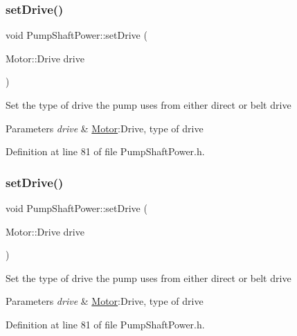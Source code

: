 \subsubsection{\texorpdfstring{set\+Drive()}{setDrive()}\hspace{0.1cm}{\footnotesize\ttfamily [1/3]}}
{\footnotesize\ttfamily void Pump\+Shaft\+Power\+::set\+Drive (\begin{DoxyParamCaption}\item[{Motor\+::\+Drive}]{drive }\end{DoxyParamCaption})\hspace{0.3cm}{\ttfamily [inline]}}

Set the type of drive the pump uses from either direct or belt drive 
\begin{DoxyParams}{Parameters}
{\em drive} & \hyperlink{struct_motor}{Motor}\+:Drive, type of drive \\
\hline
\end{DoxyParams}


Definition at line 81 of file Pump\+Shaft\+Power.\+h.

\mbox{\label{class_pump_shaft_power_a5cbcf0acd63ae4a2ffe9a5c13ba73a3a}} 
\subsubsection{\texorpdfstring{set\+Drive()}{setDrive()}\hspace{0.1cm}{\footnotesize\ttfamily [2/3]}}
{\footnotesize\ttfamily void Pump\+Shaft\+Power\+::set\+Drive (\begin{DoxyParamCaption}\item[{Motor\+::\+Drive}]{drive }\end{DoxyParamCaption})\hspace{0.3cm}{\ttfamily [inline]}}

Set the type of drive the pump uses from either direct or belt drive 
\begin{DoxyParams}{Parameters}
{\em drive} & \hyperlink{struct_motor}{Motor}\+:Drive, type of drive \\
\hline
\end{DoxyParams}


Definition at line 81 of file Pump\+Shaft\+Power.\+h.

\mbox{\label{class_pump_shaft_power_a5cbcf0acd63ae4a2ffe9a5c13ba73a3a}} 
